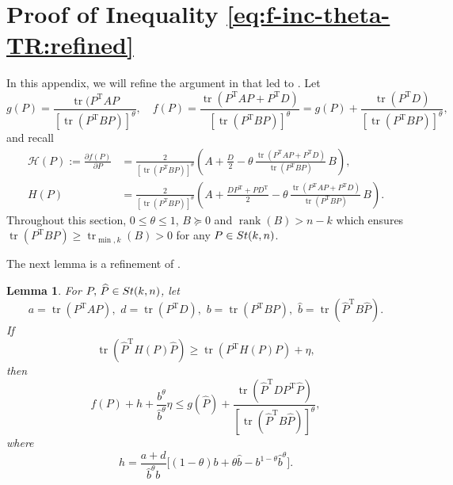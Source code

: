 \documentclass[11pt]{article}
\def\scrH{\mathscr{H}}
\def\what{\widehat}
\newcommand\STM[2]{{\rm St}(#1,#2)}
\DeclareMathOperator{\rank}{rank}
\DeclareMathOperator{\tr}{tr}
\DeclareMathOperator{\T}{T}
\newtheorem{lemma}{Lemma}[section]
\theoremstyle{definition}
\numberwithin{equation}{section}
\begin{document}
\section{Proof of Inequality \eqref{eq:f-inc-theta-TR:refined}}\label{sec:f-inc-theta-TR:pf}
In this appendix, we will refine the argument in \cite{wazl:2023} that led to \cite[Theorem 2.2]{wazl:2023}.  Let
$$
g(P)=\frac {\tr(P^{\T}AP}{[\tr(P^{\T}BP)]^{\theta}}, \quad
f(P)=\frac {\tr(P^{\T}AP+P^{\T}D)}{[\tr(P^{\T}BP)]^{\theta}}=g(P)+\frac {\tr(P^{\T}D)}{[\tr(P^{\T}BP)]^{\theta}},
$$
and recall
\begin{align*}
\scrH(P):=\frac{\partial f(P)}{\partial P}
    &=\frac 2{[\tr(P^{\T}BP)]^{\theta}}
     \left(A+\frac D2-\theta\,\frac {\tr(P^{\T}AP+P^{\T}D)}{\tr(P^{\T}BP)}\,B\right), \\
H(P)&=\frac 2{[\tr(P^{\T}BP)]^{\theta}}
     \left(A+\frac {DP^{\T}+PD^{\T}}2-\theta\,\frac {\tr(P^{\T}AP+P^{\T}D)}{\tr(P^{\T}BP)}\,B\right).
\end{align*}
Throughout this section, $0\le\theta\le 1$, $B\succeq 0$ and $\rank(B)>n-k$ which ensures $\tr(P^{\T}BP)\ge \tr_{\min,k}(B)>0$ for any $P\in\STM{k}{n}$.

The next lemma
is a refinement of \cite[Lemma 2.1]{wazl:2023}.

\def\newalpha{a}
\def\newbeta{b}
\def\newdelta{d}
\def\newgamma{h}

\begin{lemma}\label{lm:mono:wazl2022}
For $P,\,\what P\in\STM{k}{n}$, let
\begin{equation}\nonumber %
\newalpha=\tr ( P^{\T}AP),\,\,
\newdelta=\tr ( P^{\T}D),\,\,
\newbeta=\tr ( P^{\T} B P),\,\,
\hat\newbeta=\tr (\what P^{\T} B\what P).
\end{equation}
If
\begin{equation}\label{eq:tr-ineq}
\tr(\what P^{\T} H(P)\what P)\ge\tr ( P^{\T} H(P) P)+\eta,
\end{equation}
then
\begin{equation}\label{eq:obj-ineq-detail}
f(P)+\newgamma+\frac {\newbeta^{\theta}}{\hat\newbeta^{\theta}}\eta\le g(\what P)
             +\frac {\tr(\what P^{\T} DP^{\T}\what P)}{[\tr(\what P^{\T} B\what P)]^{\theta}},
\end{equation}
where
\begin{equation}\label{eq:gamma}
\newgamma=\frac {\newalpha+\newdelta}{\hat\newbeta^{\theta}\newbeta}
     \Big[(1-\theta)\newbeta+\theta\hat\newbeta-\newbeta^{1-\theta}\hat\newbeta^{\theta}\Big].
\end{equation}
\end{lemma}
\end{document}
